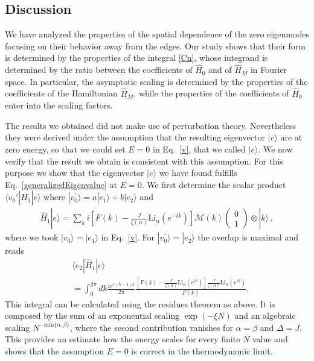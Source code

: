 \documentclass[pra,twocolumn,
superscriptaddress,
showpacs,
aps
]{revtex4-1}
\begin{document}
\subsection{Discussion}

We have analyzed the properties of the spatial dependence of the zero eigenmodes focusing on their behavior away from the edges. Our study shows that their form is determined by the properties of the integral \eqref{Cn}, whose integrand is determined by the ratio between the coefficients of $\hat H_0$ and of $\hat H_M$ in Fourier space. In particular, the asymptotic scaling is determined by the properties of the coefficients of the Hamiltonian $\hat H_M$, while the properties of the coefficients of $\hat{H}_0$ enter into the scaling factors. 

The results we obtained did not make use of perturbation theory. Nevertheless they were derived under the assumption that the resulting eigenvector $|v\rangle$ are at zero energy, so that we could set $E=0$  in Eq.~\eqref{v}, that we called $|e\rangle$. We now verify that the result we obtain is consistent with this assumption. For this purpose we show that the eigenvector $|e\rangle$ we have found fulfills Eq.~\eqref{generalizedEigenvalue} at $E=0$. We first determine the scalar product $\langle v_0'|\hat{H}_1|e\rangle$ where $|v_0^\prime\rangle=a |e_1\rangle+b  |e_2\rangle$ and 
\begin{align}
\hat{H}_1|e\rangle=\sum_{k}i\left[F(k)-\frac{J}{\zeta(\alpha)}\mathrm{Li}_{\alpha}(e^{-ik})\right]{\mathcal M}(k)\begin{pmatrix}
0\\
1
\end{pmatrix}\otimes|k\rangle\,,
\end{align} 
where we took $|v_0\rangle=|e_1\rangle$ in Eq.~\eqref{v}. For $|v_0^\prime\rangle= |e_2\rangle$ the overlap is maximal and reads 
\begin{align}
&\langle e_2|\hat{H}_1|e\rangle\nonumber\\
&=\int_{0}^{2\pi}dk\frac{ie^{i(N-1)k}}{2\pi}\frac{\left[F(k)-\frac{J}{\zeta(\alpha)}\mathrm{Li}_{\alpha}(e^{ik})\right]\frac{J}{\zeta(\alpha)}\mathrm{Li}_{\alpha}(e^{ik})}{F(k)}.\label{Energyestimate}
\end{align} 
This integral can be calculated using the residues theorem as above. It is composed by the sum of an exponential scaling $\exp(-\xi N)$ and an algebraic scaling $N^{-\mathrm{min}\{\alpha,\beta\}}$, where the second contribution vanishes for  $\alpha=\beta$ and $\Delta=J$. This provides an estimate how the energy scales for every finite $N$ value and shows that the assumption $E=0$ is correct in the thermodynamic limit.
\end{document}
